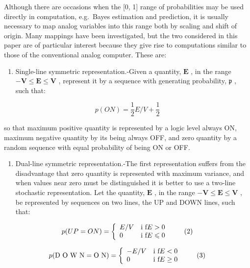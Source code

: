 \documentclass[
  10
]{article}
\providecommand{\tightlist}{%
  \setlength{\itemsep}{0pt}\setlength{\parskip}{0pt}}
\begin{document}
Although there are occasions when the {[}0, 1{]} range of probabilities
may be used directly in computation, e.g.~Bayes estimation and
prediction, it is usually necessary to map analog variables into this
range both by scaling and shift of origin. Many mappings have been
investigated, but the two considered in this paper are of particular
interest because they give rise to computations similar to those of the
conventional analog computer. These are:

\begin{enumerate}
\def\labelenumi{(\roman{enumi})}
\tightlist
\item
  Single-line symmetric representation.-Given a quantity, \(\mathbf{E}\)
  , in the range \(-\mathbf{V} \leq \mathbf{E} \leq \mathbf{V}\) ,
  represent it by a sequence with generating probability,
  \(\mathfrak{p}\) , such that:
\end{enumerate}

\[
p (O N) = \frac {1}{2} E / V + \frac {1}{2} \tag {1}
\]

so that maximum positive quantity is represented by a logic level always
ON, maximum negative quantity by its being always OFF, and zero quantity
by a random sequence with equal probability of being ON or OFF.

\begin{enumerate}
\def\labelenumi{(\roman{enumi})}
\setcounter{enumi}{1}
\tightlist
\item
  Dual-line symmetric representation.-The first representation suffers
  from the disadvantage that zero quantity is represented with maximum
  variance, and when values near zero must be distinguished it is better
  to use a two-line stochastic representation. Let the quantity,
  \(\mathbf{E}\) , in the range
  \(-\mathbf{V} \leq \mathbf{E} \leq \mathbf{V}\) , be represented by
  sequences on two lines, the UP and DOWN lines, such that:
\end{enumerate}

\[
p (U P = O N) = \left\{ \begin{array}{l l} E / V & \text {i f} E > 0 \\ 0 & \text {i f} E \leqslant 0 \end{array} \right. \tag {2}
\]

\[
p (\text {D O W N} = \text {O N}) = \left\{ \begin{array}{l l} - E / V & \text {i f} E <   0 \\ 0 & \text {i f} E \geq 0 \end{array} \right. \tag {3}
\]
\end{document}
